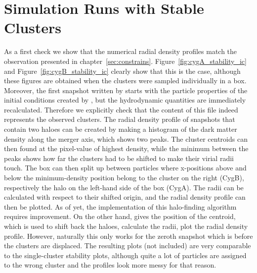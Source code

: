 \documentclass[MScProj_TLRH_ClusterEnergy.tex]{subfiles}
\begin{document}
\section{Simulation Runs with Stable Clusters}
\label{sec:SimulationRun}
As a first check we show that the numerical radial density profiles match the
 observation presented in chapter~\ref{sec:constrains}.
Figure~\ref{fig:cygA_stability_ic} and Figure~\ref{fig:cygB_stability_ic} clearly
show that this is the case, although these figures are obtained when the clusters
were sampled individually in a box. Moreover, the first snapshot written by 
 starts with the particle properties of the initial conditions created
by , but the hydrodynamic quantities are immediately recalculated. 
Therefore we explicitly check that the content of this file indeed represents
the observed clusters. The radial density profile of snapshots that contain two
haloes can be created by making a histogram of the dark matter density along the 
merger axis, which shows two peaks. The cluster centroids can then found at the
pixel-value of highest density, while the minimum between the peaks shows how
far the clusters had to be shifted to make their virial radii touch. The box can
then split up between particles where x-positions above and below the minimum-density
position belong to the cluster on the right (CygB), respectively the halo on the
left-hand side of the box (CygA). The radii can be calculated with respect to their
shifted origin, and the radial density profile can then be plotted. As of yet, 
the implementation of this halo-finding algorithm requires improvement. On the
other hand,  gives the position of the centroid, which is used
to shift back the haloes, calculate the radii, plot the radial density profile.
However, naturally this only works for the zeroth snapshot which is before the 
clusters are displaced. The resulting plots (not included) are very comparable
to the single-cluster stability plots, although quite a lot of particles are 
assigned to the wrong cluster and the profiles look more messy for that reason.
\end{document}

